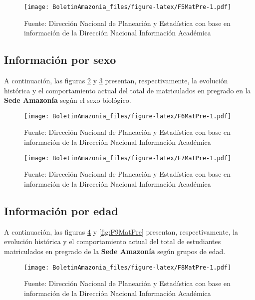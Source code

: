 \documentclass[
]{book}
\begin{document}
\begin{figure}
\centering
\texttt{[image: BoletinAmazonia\_files/figure-latex/F5MatPre-1.pdf]}
\caption{\label{fig:F5MatPre}Fuente: Dirección Nacional de Planeación y Estadística con base en información de la Dirección Nacional Información Académica}
\end{figure}

\hypertarget{informaciuxf3n-por-sexo-4}{%
\subsection{Información por sexo}\label{informaciuxf3n-por-sexo-4}}

A continuación, las figuras \ref{fig:F6MatPre} y \ref{fig:F7MatPre} presentan, respectivamente, la evolución histórica y el comportamiento actual del total de matriculados en pregrado en la \textbf{Sede Amazonía} según el sexo biológico.

\begin{figure}
\centering
\texttt{[image: BoletinAmazonia\_files/figure-latex/F6MatPre-1.pdf]}
\caption{\label{fig:F6MatPre}Fuente: Dirección Nacional de Planeación y Estadística con base en información de la Dirección Nacional Información Académica}
\end{figure}

\begin{figure}
\centering
\texttt{[image: BoletinAmazonia\_files/figure-latex/F7MatPre-1.pdf]}
\caption{\label{fig:F7MatPre}Fuente: Dirección Nacional de Planeación y Estadística con base en información de la Dirección Nacional Información Académica}
\end{figure}

\hypertarget{informaciuxf3n-por-edad-4}{%
\subsection{Información por edad}\label{informaciuxf3n-por-edad-4}}

A continuación, las figuras \ref{fig:F8MatPre} y \ref{fig:F9MatPre} presentan, respectivamente, la evolución histórica y el comportamiento actual del total de estudiantes matriculados en pregrado de la \textbf{Sede Amazonía} según grupos de edad.

\begin{figure}
\centering
\texttt{[image: BoletinAmazonia\_files/figure-latex/F8MatPre-1.pdf]}
\caption{\label{fig:F8MatPre}Fuente: Dirección Nacional de Planeación y Estadística con base en información de la Dirección Nacional Información Académica}
\end{figure}
\end{document}

